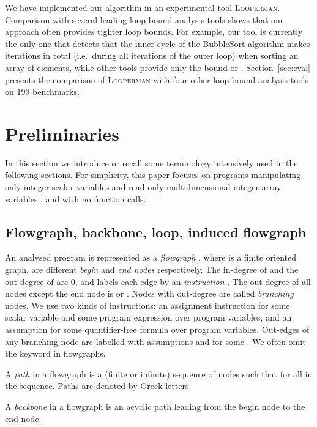 \documentclass[10pt,a4paper]{article}
\newcommand{\Looperman}{\textsc{Looperman}\xspace}
\begin{document}
We have implemented our algorithm in an experimental tool \Looperman. Comparison
with several leading loop bound analysis tools shows that our approach often
provides tighter loop bounds. For example, our tool is currently the only one
that detects that the inner cycle of the BubbleSort algorithm makes
 iterations in total (i.e.~during all iterations of the
outer loop) when sorting an array of  elements, while other tools provide
only the bound  or . Section~\ref{sec:eval} presents the
comparison of \Looperman with four other loop bound analysis tools on 199
benchmarks.





\section{Preliminaries}\label{sec:prelim}

In this section we introduce or recall some terminology intensively used in
the following sections. For simplicity, this paper focuses on programs
manipulating only integer scalar variables  and
read-only multidimensional integer array variables ,
and with no function calls.

\subsection{Flowgraph, backbone, loop, induced flowgraph}
\label{sec:flowgraph}

An analysed program is represented as a \emph{flowgraph}
 , where  is a finite
oriented graph,  are different
\emph{begin} and \emph{end nodes} respectively. The in-degree of
 and the out-degree of  are 0, and
 labels each edge  by an
\emph{instruction} . The out-degree of all nodes except the end
node is  or . Nodes with out-degree  are called \emph{branching}
nodes. We use two kinds of instructions: an assignment instruction
 for some scalar variable  and some
program expression  over program variables, and an assumption
 for some quantifier-free formula  over
program variables. Out-edges of any branching node are labelled with
assumptions  and  for
some . We often omit the keyword  in flowgraphs.

A \emph{path} in a flowgraph is a (finite or infinite) sequence  of nodes such that  for all  in the
sequence. Paths are denoted by Greek letters.

A \emph{backbone} in a flowgraph is an acyclic path leading from the begin node
to the end node.
\end{document}
